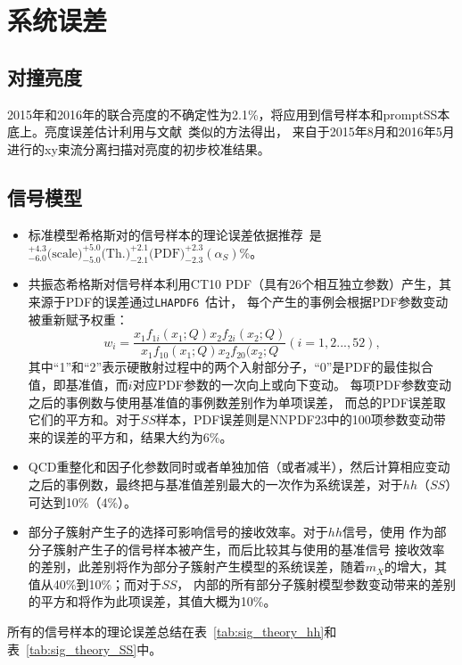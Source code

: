 \section{系统误差}\label{sec:4w_systematics}

\subsection{对撞亮度}
2015年和2016年的联合亮度的不确定性为2.1\%，将应用到信号样本和promptSS本底上。亮度误差估计利用与文献~\cite{DAPR-2013-01}类似的方法得出，
来自于2015年8月和2016年5月进行的xy束流分离扫描对亮度的初步校准结果。

\subsection{信号模型}
\begin{itemize}
 \item 标准模型希格斯对的信号样本的理论误差依据推荐~\cite{LHCdiHiggsXsec}是\\ 
 $^{+4.3}_{-6.0}\text{(scale)} ^{+5.0}_{-5.0}\text{(Th.)}  ^{+2.1}_{-2.1}\text{(PDF)} ^{+2.3}_{-2.3} (\alpha_S)$\%。
  \item 共振态希格斯对信号样本利用CT10 PDF（具有26个相互独立参数）产生，其来源于PDF的误差通过\texttt{LHAPDF6}~\cite{Buckley:2014ana}估计，
  每个产生的事例会根据PDF参数变动被重新赋予权重：\\
  \begin{equation}
w_{i}=\frac{x_1f_{1i}(x_1;Q) x_2f_{2i}(x_2;Q)}{x_1f_{10}(x_1;Q) x_2f_{20}(x_2;Q} (i=1,2...,52),
  \end{equation}
  其中``1''和``2''表示硬散射过程中的两个入射部分子，``0''是PDF的最佳拟合值，即基准值，而$i$对应PDF参数的一次向上或向下变动。
  每项PDF参数变动之后的事例数与使用基准值的事例数差别作为单项误差，
  而总的PDF误差取它们的平方和。对于$SS$样本，PDF误差则是NNPDF23中的100项参数变动带来的误差的平方和，结果大约为6\%。
   \item QCD重整化和因子化参数同时或者单独加倍（或者减半），然后计算相应变动之后的事例数，最终把与基准值差别最大的一次作为系统误差，对于$hh$（$SS$）可达到10\%（4\%）。
   \item 部分子簇射产生子的选择可影响信号的接收效率。对于$hh$信号，使用 作为部分子簇射产生子的信号样本被产生，而后比较其与使用\Herwigpp 的基准信号
   接收效率的差别，此差别将作为部分子簇射产生模型的系统误差，随着$m_X$的增大，其值从40\%到10\%；而对于$SS$， 内部的所有部分子簇射模型参数变动带来的差别
   的平方和将作为此项误差，其值大概为10\%。
\end{itemize}
所有的信号样本的理论误差总结在表~\ref{tab:sig_theory_hh}和表~\ref{tab:sig_theory_SS}中。



